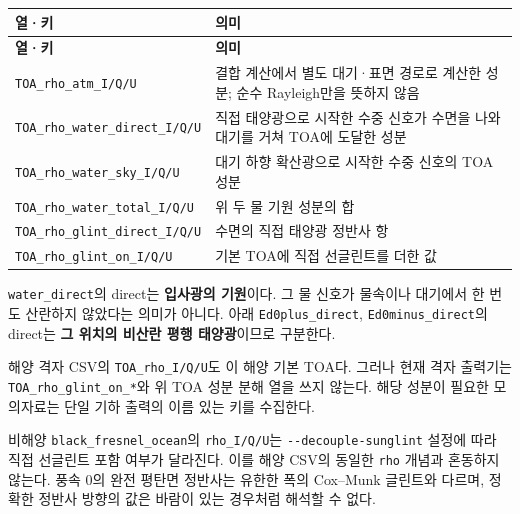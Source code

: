 {\TableFont
\begin{longtable}{@{}>{\raggedright\arraybackslash}p{}>{\raggedright\arraybackslash}p{}@{}}
\toprule
\textbf{열·키} & \textbf{의미} \\
\midrule
\endfirsthead
\toprule
\textbf{열·키} & \textbf{의미} \\
\midrule
\endhead
\bottomrule
\endfoot
\texttt{TOA\_\allowbreak{}rho\_\allowbreak{}atm\_\allowbreak{}I/\allowbreak{}Q/\allowbreak{}U} & 결합 계산에서 별도 대기·표면 경로로 계산한 성분; 순수 Rayleigh만을 뜻하지 않음 \\
\texttt{TOA\_\allowbreak{}rho\_\allowbreak{}water\_\allowbreak{}direct\_\allowbreak{}I/\allowbreak{}Q/\allowbreak{}U} & 직접 태양광으로 시작한 수중 신호가 수면을 나와 대기를 거쳐 TOA에 도달한 성분 \\
\texttt{TOA\_\allowbreak{}rho\_\allowbreak{}water\_\allowbreak{}sky\_\allowbreak{}I/\allowbreak{}Q/\allowbreak{}U} & 대기 하향 확산광으로 시작한 수중 신호의 TOA 성분 \\
\texttt{TOA\_\allowbreak{}rho\_\allowbreak{}water\_\allowbreak{}total\_\allowbreak{}I/\allowbreak{}Q/\allowbreak{}U} & 위 두 물 기원 성분의 합 \\
\texttt{TOA\_\allowbreak{}rho\_\allowbreak{}glint\_\allowbreak{}direct\_\allowbreak{}I/\allowbreak{}Q/\allowbreak{}U} & 수면의 직접 태양광 정반사 항 \\
\texttt{TOA\_\allowbreak{}rho\_\allowbreak{}glint\_\allowbreak{}on\_\allowbreak{}I/\allowbreak{}Q/\allowbreak{}U} & 기본 TOA에 직접 선글린트를 더한 값 \\
\end{longtable}
}

\texttt{water\_\allowbreak{}direct}의 direct는 \textbf{입사광의 기원}이다. 그 물 신호가 물속이나 대기에서 한 번도 산란하지 않았다는 의미가 아니다. 아래 \texttt{Ed0plus\_\allowbreak{}direct}, \texttt{Ed0minus\_\allowbreak{}direct}의 direct는 \textbf{그 위치의 비산란 평행 태양광}이므로 구분한다.

해양 격자 CSV의 \texttt{TOA\_\allowbreak{}rho\_\allowbreak{}I/\allowbreak{}Q/\allowbreak{}U}도 이 해양 기본 TOA다. 그러나 현재 격자 출력기는 \texttt{TOA\_\allowbreak{}rho\_\allowbreak{}glint\_\allowbreak{}on\_\allowbreak{}*}와 위 TOA 성분 분해 열을 쓰지 않는다. 해당 성분이 필요한 모의자료는 단일 기하 출력의 이름 있는 키를 수집한다.

비해양 \texttt{black\_\allowbreak{}fresnel\_\allowbreak{}ocean}의 \texttt{rho\_\allowbreak{}I/\allowbreak{}Q/\allowbreak{}U}는 \texttt{-\allowbreak{}-\allowbreak{}decouple-\allowbreak{}sunglint} 설정에 따라 직접 선글린트 포함 여부가 달라진다. 이를 해양 CSV의 동일한 \texttt{rho} 개념과 혼동하지 않는다. 풍속 0의 완전 평탄면 정반사는 유한한 폭의 Cox--Munk 글린트와 다르며, 정확한 정반사 방향의 값은 바람이 있는 경우처럼 해석할 수 없다.

